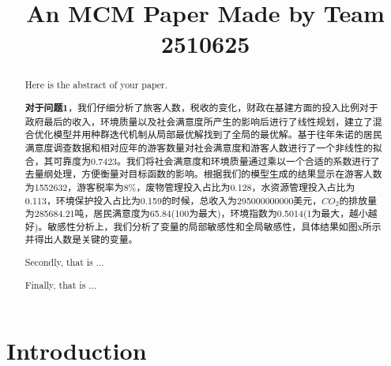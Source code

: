 \documentclass[12pt]{article}  %
\title{An MCM Paper Made by Team 2510625}  %
\begin{document}
\begin{abstract}
    Here is the abstract of your paper.

    \textbf{对于问题1}，我们仔细分析了旅客人数，税收的变化，财政在基建方面的投入比例对于政府最后的收入，环境质量以及社会满意度所产生的影响后进行了线性规划，建立了混合优化模型并用种群迭代机制从局部最优解找到了全局的最优解。基于往年朱诺的居民满意度调查数据和相对应年的游客数量对社会满意度和游客人数进行了一个非线性的拟合，其可靠度为0.7423。我们将社会满意度和环境质量通过乘以一个合适的系数进行了去量纲处理，方便衡量对目标函数的影响。根据我们的模型生成的结果显示在游客人数为1552632，游客税率为8\%，废物管理投入占比为0.128，水资源管理投入占比为0.113，环境保护投入占比为0.159的时候，总收入为295000000000美元，$CO_{2}$的排放量为285684.21吨，居民满意度为65.84(100为最大)，环境指数为0.5014(1为最大，越小越好)。敏感性分析上，我们分析了变量的局部敏感性和全局敏感性，具体结果如图x所示并得出人数是关键的变量。

    Secondly, that is ...

    Finally, that is ...


\end{abstract}

\maketitle  %
\tableofcontents  %


\section{Introduction}
\end{document}
